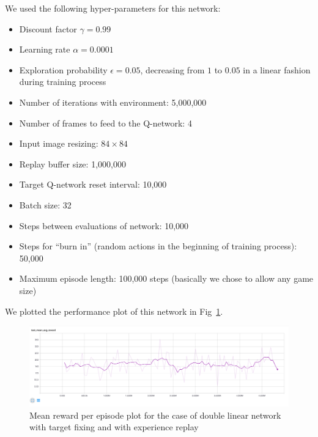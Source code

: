 \documentclass{article}
\begin{document}
We used the following hyper-parameters for this network:
\begin{itemize}
  \item Discount factor $\gamma=0.99$
  \item Learning rate $\alpha=0.0001$
  \item Exploration probability $\epsilon=0.05$, decreasing from $1$ to $0.05$ in a linear fashion during training process
  \item Number of iterations with environment: 5,000,000
  \item Number of frames to feed to the Q-network: 4
  \item Input image resizing: $84\times84$
  \item Replay buffer size: 1,000,000
  \item Target Q-network reset interval: 10,000
  \item Batch size: 32
  \item Steps between evaluations of network: 10,000
  \item Steps for ``burn in'' (random actions in the beginning of training process): 50,000
  \item Maximum episode length: 100,000 steps (basically we chose to allow any game size)
\end{itemize}

We plotted the performance plot of this network in Fig~\ref{fig:r_q4}.


\begin{figure}[h]
  \label{fig:r_q4} 
  \centering
  \includegraphics[width=1.0\textwidth]{images/r_q4}
  \caption{Mean reward per episode plot for the case of double linear network with target fixing and with experience replay}
\end{figure}
\end{document}
